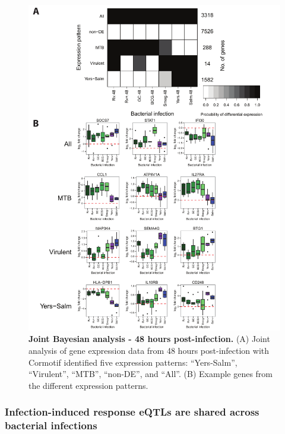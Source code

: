 \begin{figure}
\centering
\includegraphics[width=5in]{img/ch02/fig-04-joint-48h.pdf}
\caption[Joint Bayesian analysis - 48 hours
  post-infection.]{\textbf{Joint Bayesian analysis - 48 hours
    post-infection.} (A) Joint analysis of gene expression data from
  48 hours post-infection with Cormotif identified five expression
  patterns: ``Yers-Salm'', ``Virulent'', ``MTB'', ``non-DE'', and
  ``All''. (B) Example genes from the different expression patterns.}
\label{fig:joint-48h}
\end{figure}

\subsubsection{Infection-induced response eQTLs are shared across
bacterial
infections}\label{infection-induced-response-eqtls-are-shared-across-bacterial-infections}

